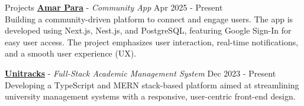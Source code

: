 \begin{rSection}{Projects}
  \textbf{\href{https://www.github.com/najmulhc/amar-para}{Amar Para}} - \textit{Community App} \hfill Apr 2025 - Present\\
  Building a community-driven platform to connect and engage users. The app is developed using Next.js, Nest.js, and PostgreSQL, featuring Google Sign-In for easy user access. The project emphasizes user interaction, real-time notifications, and a smooth user experience (UX).

  \textbf{\href{https://najmulhc.vercel.app/project/65cd62557654d8ac68b84c61}{Unitracks}} - \textit{Full-Stack Academic Management System} \hfill Dec 2023 - Present\\
  Developing a TypeScript and MERN stack-based platform aimed at streamlining university management systems with a responsive, user-centric front-end design.
  \end{rSection}
